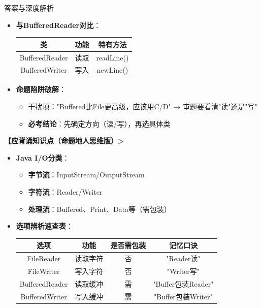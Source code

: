 \documentclass[12pt, a4paper]{ctexart}
\begin{document}
\begin{bluebox}{答案与深度解析}
\begin{itemize}[label={}, nosep]
\begin{itemize}[label={}, leftmargin=*, nosep]
			\item \textbf{与BufferedReader对比}：
			      \begin{center}
				      \begin{tabular}{|c|c|c|}
					      \hline
					      \textbf{类}     & \textbf{功能} & \textbf{特有方法} \\
					      \hline
					      BufferedReader & 读取          & readLine()    \\
					      \hline
					      BufferedWriter & 写入          & newLine()     \\
					      \hline
				      \end{tabular}
			      \end{center}

			\item \textbf{命题陷阱破解}：
			      \begin{itemize}[label={}, nosep]
				      \item 干扰项："Buffered比File更高级，应该用C/D" → 审题要看清"读"还是"写"
				      \item \textbf{必考结论}：先确定方向（读/写），再选具体类
			      \end{itemize}
		\end{itemize}
	\end{itemize}

	\textbf{【应背诵知识点（命题地人思维版）>}
	\begin{itemize}[label={}, nosep]
		\item \textbf{Java I/O分类}：
		      \begin{itemize}[label={}, nosep]
			      \item \textbf{字节流}：InputStream/OutputStream
			      \item \textbf{字符流}：Reader/Writer
			      \item \textbf{处理流}：Buffered、Print、Data等（需包装）
		      \end{itemize}

		\item \textbf{选项辨析速查表}：
		      \begin{center}
			      \begin{tabular}{|c|c|c|c|}
				      \hline
				      \textbf{选项}    & \textbf{功能} & \textbf{是否需包装} & \textbf{记忆口诀}    \\
				      \hline
				      FileReader     & 读取字符        & 否              & "Reader读"        \\
				      \hline
				      FileWriter     & 写入字符        & 否              & "Writer写"        \\
				      \hline
				      BufferedReader & 读取缓冲        & 需              & "Buffer包装Reader" \\
				      \hline
				      BufferedWriter & 写入缓冲        & 需              & "Buffer包装Writer" \\
				      \hline
			      \end{tabular}
		      \end{center}


\end{itemize}
\end{bluebox}
\end{document}
